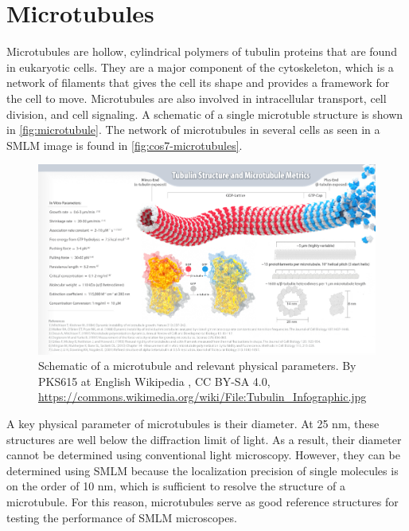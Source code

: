 \documentclass[10pt,a4paper,oneside]{book}
\begin{document}
\section{Microtubules}

Microtubules are hollow, cylindrical polymers of tubulin proteins that are found in eukaryotic cells. They are a major component of the cytoskeleton, which is a network of filaments that gives the cell its shape and provides a framework for the cell to move. Microtubules are also involved in intracellular transport, cell division, and cell signaling. A schematic of a single microtuble structure is shown in \autoref{fig:microtubule}. The network of microtubules in several cells as seen in a SMLM image is found in \autoref{fig:cos7-microtubules}.

\begin{figure}[ht]
    \centering
    \includegraphics[width=1.0\textwidth]{tubulin-infographic.jpg}
    \caption{Schematic of a microtubule and relevant physical parameters. By PKS615 at English Wikipedia , CC BY-SA 4.0, \url{https://commons.wikimedia.org/wiki/File:Tubulin_Infographic.jpg}}
    \label{fig:microtubule}
\end{figure}

A key physical parameter of microtubules is their diameter. At 25 nm, these structures are well below the diffraction limit of light. As a result, their diameter cannot be determined using conventional light microscopy. However, they can be determined using SMLM because the localization precision of single molecules is on the order of 10 nm, which is sufficient to resolve the structure of a microtubule. For this reason, microtubules serve as good reference structures for testing the performance of SMLM microscopes.
\end{document}
